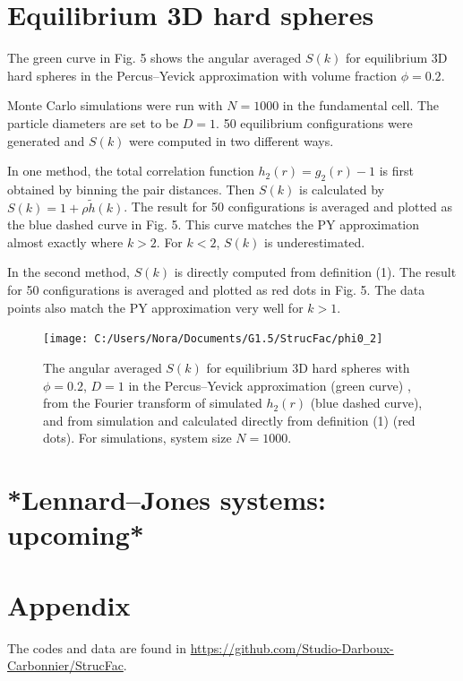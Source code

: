 \documentclass[journal=jacsat,manuscript=article]{achemso}
\begin{document}
	\newpage
	\section{Equilibrium 3D hard spheres}
	The green curve in Fig. 5 shows the angular averaged $S(k)$ for equilibrium 3D hard spheres in the Percus--Yevick approximation with volume fraction $\phi=0.2$.
	
	Monte Carlo simulations were run with $N=1000$ in the fundamental cell. The particle diameters are set to be $D=1$. 50 equilibrium configurations were generated and $S(k)$ were computed in two different ways. 
	
	In one method, the total correlation function $h_2(r)=g_2(r)-1$ is first obtained by binning the pair distances. Then $S(k)$ is calculated by $S(k)=1+\rho \tilde{h}(k)$. The result for 50 configurations is averaged and plotted as the blue dashed curve in Fig. 5. This curve matches the PY approximation almost exactly where $k>2$. For $k<2$, $S(k)$ is underestimated.
	
	In the second method, $S(k)$ is directly computed from definition (1). The result for 50 configurations is averaged and plotted as red dots in Fig. 5. The data points also match the PY approximation very well for $k>1$.
	
	\begin{figure}
		\centering
		\texttt{[image: C:/Users/Nora/Documents/G1.5/StrucFac/phi0\_2]}
		\caption{The angular averaged $S(k)$ for equilibrium 3D hard spheres with $\phi = 0.2$, $D=1$ in the Percus--Yevick approximation (green curve) , from the Fourier transform of simulated $h_2(r)$ (blue dashed curve), and from simulation and calculated directly from definition (1) (red dots). For simulations, system size $N=1000$.}
		\label{fig:theoreticalp0}
	\end{figure}
	
	\section{*Lennard--Jones systems: upcoming*}

	\newpage
	\section{Appendix}
	The codes and data are found in \url{https://github.com/Studio-Darboux-Carbonnier/StrucFac}.
\end{document}
